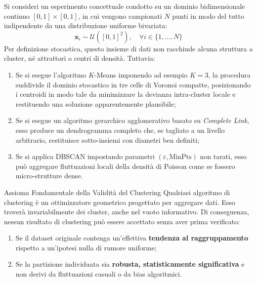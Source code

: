 Si consideri un esperimento concettuale condotto su un dominio bidimensionale continuo $[0, 1] \times [0, 1]$, in cui vengono campionati $N$ punti in modo del tutto indipendente da una distribuzione uniforme bivariata:
\begin{equation}
\label{eq:dm-uniform-noise-generation}
\mathbf{x}_i \sim \mathcal{U}\left([0, 1]^2\right), \quad \forall i \in \{1, \dots, N\}
\end{equation}
Per definizione stocastica, questo insieme di dati non racchiude alcuna struttura a cluster, né attrattori o centri di densità. Tuttavia:
\begin{enumerate}
    \item Se si esegue l'algoritmo $K$-Means imponendo ad esempio $K=3$, la procedura suddivide il dominio stocastico in tre celle di Voronoi compatte, posizionando i centroidi in modo tale da minimizzare la devianza intra-cluster locale e restituendo una soluzione apparentemente plausibile;
    \item Se si esegue un algoritmo gerarchico agglomerativo basato su \textit{Complete Link}, esso produce un dendrogramma completo che, se tagliato a un livello arbitrario, restituisce sotto-insiemi con diametri ben definiti;
    \item Se si applica DBSCAN impostando parametri $(\varepsilon, \mathrm{MinPts})$ non tarati, esso può aggregare fluttuazioni locali della densità di Poisson come se fossero micro-strutture dense.
\end{enumerate}

\begin{alertblock}{Assioma Fondamentale della Validità del Clustering}
Qualsiasi algoritmo di clustering è un ottimizzatore geometrico progettato per aggregare dati. Esso troverà invariabilmente dei cluster, anche nel vuoto informativo. Di conseguenza, nessun risultato di clustering può essere accettato senza aver prima verificato:
\begin{enumerate}[noitemsep]
    \item Se il dataset originale contenga un'effettiva \textbf{tendenza al raggruppamento} rispetto a un'ipotesi nulla di rumore uniforme;
    \item Se la partizione individuata sia \textbf{robusta, statisticamente significativa} e non derivi da fluttuazioni casuali o da bias algoritmici.
\end{enumerate}
\end{alertblock}

\FloatBarrier
